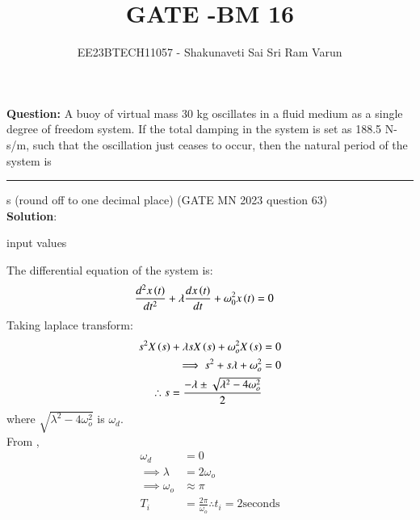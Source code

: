 \documentclass[journal,12pt,twocolumn]{IEEEtran}
\theoremstyle{remark}
\begin{document}

\vspace{3cm}

\title{GATE -BM 16}
\author{EE23BTECH11057 - Shakunaveti Sai Sri Ram Varun$^{}$%
}
\maketitle
\newpage
\bigskip
\vspace{2cm}
\textbf{Question: }
A buoy of virtual mass 30 kg oscillates in a fluid medium as a single degree of
freedom system. If the total damping in the system is set as 188.5 N-s/m, such
that the oscillation just ceases to occur, then the natural period of the system is
\rule{1cm}{0.15mm} s (round off to one decimal place)
\hfill(GATE MN 2023 question 63)\\

\textbf{Solution}:\\
\begin{table}[h!] 
\centering

\caption{input values}
\label{tab: Table mn63}
\end{table}

The differential equation of the system is:
\begin{align}
\frac{d^2x\left(t\right)}{dt^2} + \lambda \frac{dx\left(t\right)}{dt} + \omega_0^2 x\left(t\right) &= 0
\end{align}
Taking laplace transform:
\begin{align}
s^2X\left(s\right) + \lambda s X\left(s\right) + \omega_o^2 X\left(s\right)&=0\\
\implies s^2 + s\lambda + \omega_o^2 &=0\\
\therefore s = \frac{-\lambda \pm \sqrt{\lambda^2 - 4\omega_o^2}}{2}
\end{align}
where $ \sqrt{\lambda^2 - 4\omega_o^2}$ is $ \omega_d$.\\
From ,
\begin{align}
\omega_d &=0\\
\implies \lambda &= 2\omega_o\\
\implies \omega_o &\approx \pi\\
 T_i &= \frac{2\pi}{\omega_o}
 \therefore t_i = 2\text{seconds}
\end{align}
\end{document}
